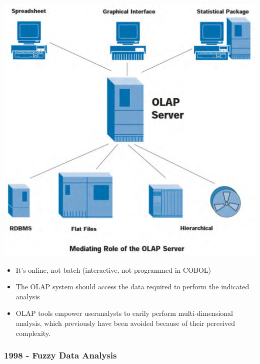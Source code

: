 \documentclass[a4paper]{article}
\begin{document}
			\begin{minipage}[c]{0.3\textwidth}
				\centering
				\includegraphics[width=\textwidth]{img/sw01/olap.png}
			\end{minipage}
			\hfill
			\begin{minipage}[c]{0.6\textwidth}
				\begin{itemize}
					\item It's online, not batch (interactive, not programmed in COBOL)
					\item The OLAP system should access the data required to perform the indicated analysis
					\item OLAP tools empower useranalysts to earily perform multi-dimensional analysis, which previously have been avoided because of their perceived complexity.
				\end{itemize}
			\end{minipage}
		
			\subsubsection{1998 - Fuzzy Data Analysis}
			
\end{document}

